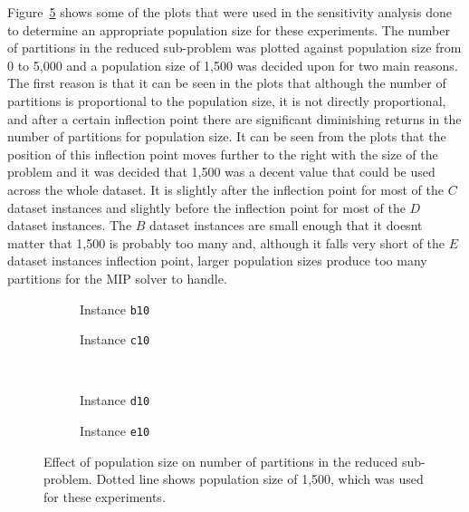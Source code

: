\documentclass[preprint]{elsarticle}
\begin{document}
Figure~\ref{fig:stpg_pop_plots} shows some of the plots that were used in the sensitivity analysis done to determine an appropriate population size for these experiments. The number of partitions in the reduced sub-problem was plotted against population size from 0 to 5,000 and a population size of 1,500 was decided upon for two main reasons. The first reason is that it can be seen in the plots that although the number of partitions is proportional to the population size, it is not directly proportional, and after a certain inflection point there are significant diminishing returns in the number of partitions for population size. It can be seen from the plots that the position of this inflection point moves further to the right with the size of the problem and it was decided that 1,500 was a decent value that could be used across the whole dataset. It is slightly after the inflection point for most of the \(C\) dataset instances and slightly before the inflection point for most of the \(D\) dataset instances. The \(B\) dataset instances are small enough that it doesnt matter that 1,500 is probably too many and, although it falls very short of the \(E\) dataset instances inflection point, larger population sizes produce too many partitions for the MIP solver to handle.
%
\begin{center}
\begin{figure}[h]
    \centering
    \begin{subfigure}{0.4\textwidth}
    \centering
    \caption{Instance \texttt{b10}}
    \label{fig:stpg_pop.1}
    \end{subfigure}
    \qquad \qquad
    \begin{subfigure}{0.4\textwidth}
    \centering
    \caption{Instance \texttt{c10}}
    \label{fig:stpg_pop.2}
    \end{subfigure}
    \\[0.5cm]
    \begin{subfigure}{0.4\textwidth}
    \centering
    \caption{Instance \texttt{d10}}
    \label{fig:stpg_pop.3}
    \end{subfigure}
    \qquad \qquad 
    \begin{subfigure}{0.4\textwidth}
    \centering
    \caption{Instance \texttt{e10}}
    \label{fig:stpg_pop.4}
    \end{subfigure}
    \caption[Effect of population size on number of partitions in the reduced sub-problem]{Effect of population size on number of partitions in the reduced sub-problem. Dotted line shows population size of 1,500, which was used for these experiments.} 
    \label{fig:stpg_pop_plots}
\end{figure}
\end{center}
\end{document}

